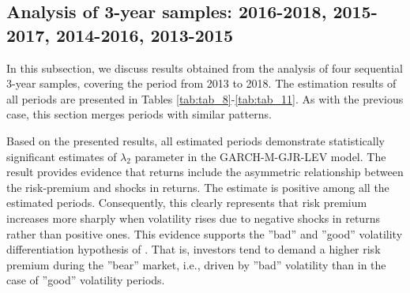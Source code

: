 \documentclass[authoryear, 1p]{elsarticle}
\numberwithin{equation}{section}
\begin{document}
\subsection{Analysis of 3-year samples: 2016-2018, 2015-2017, 2014-2016, 2013-2015}

In this subsection, we discuss results obtained from the analysis of four sequential 3-year samples, covering the period from 2013 to 2018. The estimation results of all periods are presented in Tables \ref{tab:tab_8}-\ref{tab:tab_11}. As with the previous case, this section merges periods with similar patterns.

Based on the presented results, all estimated periods demonstrate statistically significant estimates of $\lambda_{2}$ parameter in the GARCH-M-GJR-LEV model. The result provides evidence that returns include the asymmetric relationship between the risk-premium and shocks in returns. The estimate is positive among all the estimated periods. Consequently, this clearly represents that risk premium increases more sharply when volatility rises due to negative shocks in returns rather than positive ones. This evidence supports the ''bad'' and ''good'' volatility differentiation hypothesis of \citep{Bollerslev2022}. That is, investors tend to demand a higher risk premium during the ''bear'' market, i.e., driven by ''bad'' volatility than in the case of ''good'' volatility periods.
\end{document}
